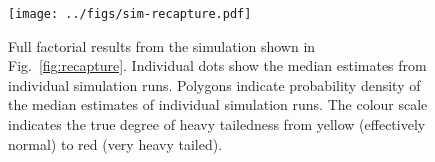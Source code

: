 \documentclass[12pt,english]{article}
\begin{document}
\clearpage

\begin{figure}[htb]
  \begin{center}
    \texttt{[image: ../figs/sim-recapture.pdf]}
    \caption{
      Full factorial results from the simulation shown in Fig.~\ref{fig:recapture}.
      Individual dots show the median estimates from individual simulation runs.
      Polygons indicate probability density of the median estimates of
      individual simulation runs.
      The colour scale indicates the true degree of heavy tailedness from
      yellow (effectively normal) to red (very heavy tailed).
    }
    \label{fig:recapture-factorial}
  \end{center}
\end{figure}

\renewcommand\theadfont{\scriptsize}
\renewcommand\theadalign{cl}
\end{document}
